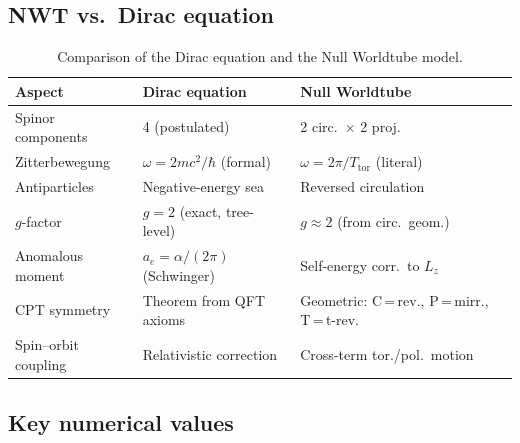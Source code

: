 \documentclass[11pt,a4paper]{article}
\begin{document}
\subsection{NWT vs.\ Dirac equation}

\begin{table}[h]
\centering
\begin{tabular}{@{}lll@{}}
\toprule
Aspect & Dirac equation & Null Worldtube \\
\midrule
Spinor components & 4 (postulated) & 2 circ.\ $\times$ 2 proj. \\
Zitterbewegung & $\omega = 2mc^2/\hbar$ (formal) & $\omega = 2\pi/T_{\text{tor}}$ (literal) \\
Antiparticles & Negative-energy sea & Reversed circulation \\
$g$-factor & $g = 2$ (exact, tree-level) & $g \approx 2$ (from circ.\ geom.) \\
Anomalous moment & $a_e = \alpha/(2\pi)$ (Schwinger) & Self-energy corr.\ to $L_z$ \\
CPT symmetry & Theorem from QFT axioms & Geometric: C\,=\,rev., P\,=\,mirr., T\,=\,t-rev. \\
Spin--orbit coupling & Relativistic correction & Cross-term tor./pol.\ motion \\
\bottomrule
\end{tabular}
\caption{Comparison of the Dirac equation and the Null Worldtube model.}
\label{tab:dirac-comparison}
\end{table}

\subsection{Key numerical values}
\end{document}
